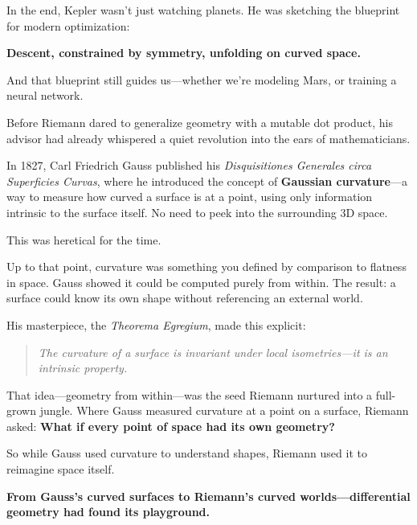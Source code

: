 In the end, Kepler wasn’t just watching planets.  
He was sketching the blueprint for modern optimization:

\textbf{Descent, constrained by symmetry, unfolding on curved space.}

And that blueprint still guides us—whether we’re modeling Mars, or training a neural network.


\begin{tcolorbox}[colback=gray!5!white, colframe=black, title={Historical Sidebar: How Gaussian Curvature Paved the Road to Riemann}]
  Before Riemann dared to generalize geometry with a mutable dot product, his advisor had already whispered a quiet revolution into the ears of mathematicians.
  
  In 1827, Carl Friedrich Gauss published his \textit{Disquisitiones Generales circa Superficies Curvas}, where he introduced the concept of \textbf{Gaussian curvature}—a way to measure how curved a surface is at a point, using only information intrinsic to the surface itself. No need to peek into the surrounding 3D space.
  
  This was heretical for the time.
  
  Up to that point, curvature was something you defined by comparison to flatness in space. Gauss showed it could be computed purely from within. The result: a surface could know its own shape without referencing an external world.
  
  His masterpiece, the \textit{Theorema Egregium}, made this explicit:
  \begin{quote}
  \textit{The curvature of a surface is invariant under local isometries—it is an intrinsic property.}
  \end{quote}
  
  That idea—geometry from within—was the seed Riemann nurtured into a full-grown jungle. Where Gauss measured curvature at a point on a surface, Riemann asked: 
  \textbf{What if every point of space had its own geometry?}
  
  So while Gauss used curvature to understand shapes,
  Riemann used it to reimagine space itself.
  
  \textbf{From Gauss’s curved surfaces to Riemann’s curved worlds—differential geometry had found its playground.}
\end{tcolorbox}
